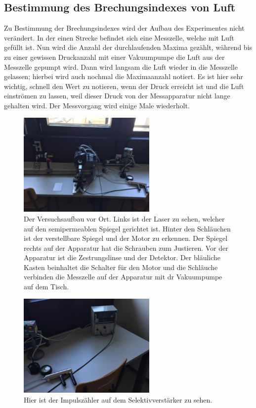 \subsection{Bestimmung des Brechungsindexes von Luft}
Zu Bestimmung der Brechungsindexes wird der Aufbau des Experimentes nicht verändert. In der einen Strecke befindet sich eine Messzelle, welche mit Luft gefüllt ist.
Nun wird die Anzahl der durchlaufenden Maxima gezählt, während bis zu einer gewissen Druckanzahl mit einer Vakuumpumpe die Luft aus der Messzelle gepumpt wird.
Dann wird langsam die Luft wieder in die Messzelle gelassen; hierbei wird auch nochmal die Maximaanzahl notiert. Es ist hier sehr wichtig, schnell den Wert zu notieren,
wenn der Druck erreicht ist und die Luft einströmen zu lassen, weil dieser Druck von der Messapparatur nicht lange gehalten wird. Der Messvorgang wird einige Male 
wiederholt.

\begin{figure}
    \centering
    \includegraphics[width=0.6\textwidth]{content/aufbaufoto1.jpeg}
    \caption{Der Versuchsaufbau vor Ort. Links ist der Laser zu sehen, welcher auf den semipermeablen Spiegel gerichtet ist. Hinter den Schläuchen ist der verstellbare
    Spiegel und der Motor zu erkennen. Der Spiegel rechts auf der Apparatur hat die Schrauben zum Justieren. Vor der Apparatur ist die Zestrungslinse und der Detektor.
    Der bläuliche Kasten beinhaltet die Schalter für den Motor und die Schläuche verbinden die Messzelle auf der Apparatur mit dr Vakuumpumpe auf dem Tisch.}
\end{figure}

\begin{figure}
    \centering
    \includegraphics[width=0.6\textwidth]{content/aufbaufoto2.jpeg}
    \caption{Hier ist der Impulszähler auf dem Selektivverstärker zu sehen.}
\end{figure}